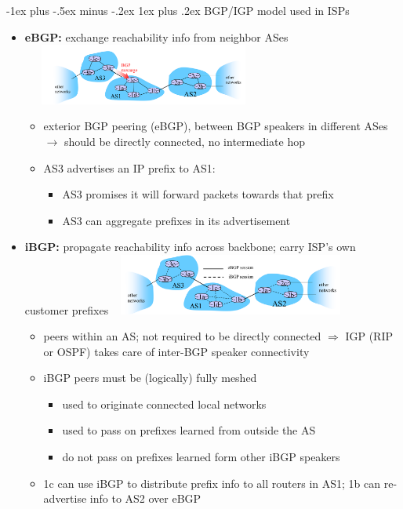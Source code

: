 \documentclass[10pt,landscape]{article}
\makeatletter
\newcommand{\subsubsubsection}{\@startsection{subsubsection}{3}{0mm}%
                                {-1ex plus -.5ex minus -.2ex}%
                                {1ex plus .2ex}%
                                {\normalfont\scriptsize\bfseries}}
\makeatother
\begin{document}
\begin{multicols*}{3}
\subsubsubsection{BGP/IGP model used in ISPs}
\begin{itemize}[topsep=0pt,noitemsep,wide=0pt, leftmargin=\dimexpr{} + 2\relax]
  \item \textbf{eBGP:} exchange reachability info from neighbor ASes
  \includegraphics*[width=8cm, height=2cm]{images/ebgp.png}
  \begin{itemize}[topsep=0pt,noitemsep,wide=0pt, leftmargin=\dimexpr{} + 2\relax]
    \item exterior BGP peering (eBGP), between BGP speakers in different ASes $\rightarrow$ should be directly connected, no intermediate hop
    \item AS3 advertises an IP prefix to AS1:
    \begin{itemize}[topsep=0pt,noitemsep,wide=0pt, leftmargin=\dimexpr{} + 2\relax]
      \item AS3 promises it will forward packets towards that prefix
      \item AS3 can aggregate prefixes in its advertisement
    \end{itemize}
  \end{itemize}
  \item \textbf{iBGP:} propagate reachability info across backbone; carry ISP’s own customer prefixes
  \includegraphics*[width=8cm, height=2cm]{images/ibgp.png}
  \begin{itemize}[topsep=0pt,noitemsep,wide=0pt, leftmargin=\dimexpr{} + 2\relax]
    \item peers within an AS; not required to be directly connected $\Rightarrow$ IGP (RIP or OSPF) takes care of inter-BGP speaker connectivity
    \item iBGP peers must be (logically) fully meshed
    \begin{itemize}[topsep=0pt,noitemsep,wide=0pt, leftmargin=\dimexpr{} + 2\relax]
      \item used to originate connected local networks
      \item used to pass on prefixes learned from outside the AS
      \item do not pass on prefixes learned form other iBGP speakers
    \end{itemize}
    \item 1c can use iBGP to distribute prefix info to all routers in AS1; 1b can re-advertise info to AS2 over eBGP
  \end{itemize}
\end{itemize}


\end{multicols*}
\end{document}
